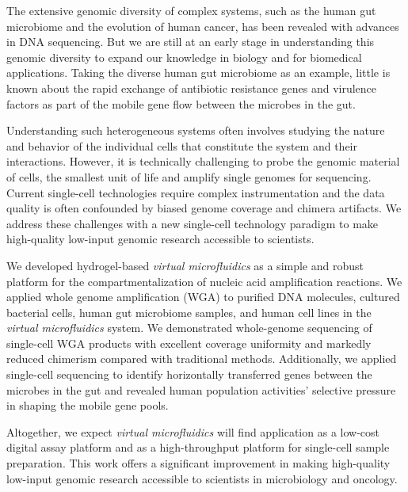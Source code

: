 % 
% 
%
The extensive genomic diversity of complex systems, such as the human gut microbiome and the evolution of human cancer, has been revealed with advances in DNA sequencing. But we are still at an early stage in understanding this genomic diversity to expand our knowledge in biology and for biomedical applications. Taking the diverse human gut microbiome as an example, little is known about the rapid exchange of antibiotic resistance genes and virulence factors as part of the mobile gene flow between the microbes in the gut.

Understanding such heterogeneous systems often involves studying the nature and behavior of the individual cells that constitute the system and their interactions. However, it is technically challenging to probe the genomic material of cells, the smallest unit of life and amplify single genomes for sequencing. Current single-cell technologies require complex instrumentation and the data quality is often confounded by biased genome coverage and chimera artifacts. We address these challenges with a new single-cell technology paradigm to make high-quality low-input genomic research accessible to scientists. 

We developed hydrogel-based \textit{virtual microfluidics} as a simple and robust platform for the compartmentalization of nucleic acid amplification reactions. We applied whole genome amplification (WGA) to purified DNA molecules, cultured bacterial cells, human gut microbiome samples, and human cell lines in the \textit{virtual microfluidics} system. We demonstrated whole-genome sequencing of single-cell WGA products with excellent coverage uniformity and markedly reduced chimerism compared with traditional methods. Additionally, we applied single-cell sequencing to identify horizontally transferred genes between the microbes in the gut and revealed human population activities' selective pressure in shaping the mobile gene pools. 

Altogether, we expect \textit{virtual microfluidics} will find application as a low-cost digital assay platform and as a high-throughput platform for single-cell sample preparation. This work offers a significant improvement in making high-quality low-input genomic research accessible to scientists in microbiology and oncology. 

